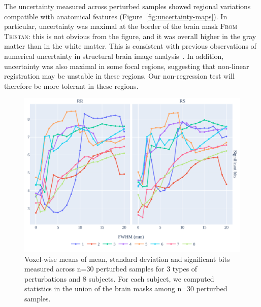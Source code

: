 \documentclass{article}
\newcommand{\TG}[1]{\color{blue}\textsc{From Tristan:} #1\color{black}\xspace}
\begin{document}
The uncertainty measured across perturbed samples showed regional variations compatible with anatomical features (Figure~\ref{fig:uncertainty-maps}). In particular, uncertainty was
maximal at the border of the brain mask \TG{this is not obvious from the figure}, and it was overall higher in the gray matter than in the white matter.
This is consistent with previous observations of numerical uncertainty in structural brain image analysis~\cite{salari2021accurate}.
In addition, uncertainty was also maximal in some focal regions, suggesting that non-linear registration may be unstable in these regions. Our non-regression test will therefore be more tolerant in these regions.

\begin{figure}
    \centering
    \includegraphics[width=\linewidth]{figures/stats.pdf}
    \caption{Voxel-wise means of mean, standard deviation and significant bits
        measured across n=30 perturbed samples for 3 types of perturbations and 8
        subjects. For each subject, we computed statistics in the union of the brain
        masks among n=30 perturbed samples.}
    \label{fig:significant-digits}
\end{figure}
\end{document}
